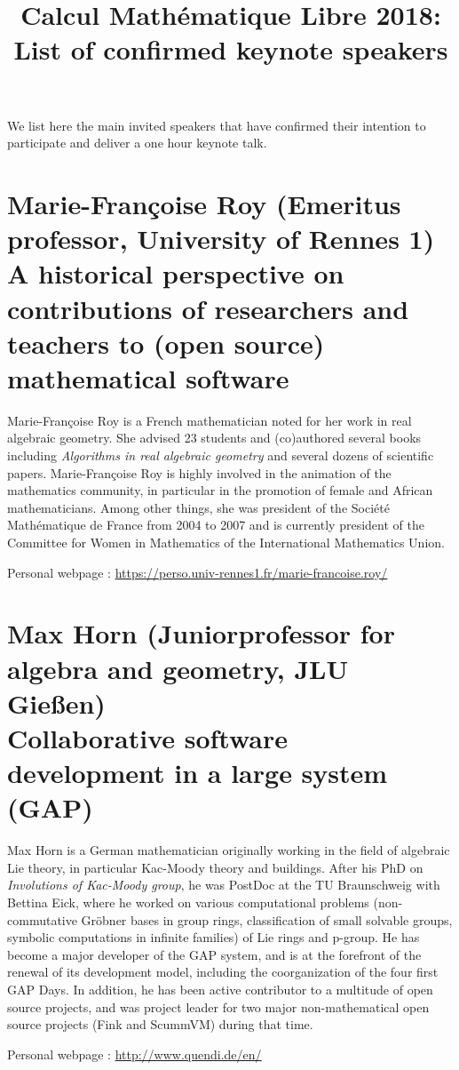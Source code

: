 \documentclass[12pt]{paper}
\title{Calcul Mathématique Libre 2018:\\ List of confirmed keynote speakers}
\date{}
\newcommand{\orateur}[3]{%
  \section*{%
    #1 {\small(#2)}\nopagebreak\\
    #3}
}
\begin{document}
\maketitle
\thispagestyle{empty}

We list here the main invited speakers that have confirmed their
intention to participate and deliver a one hour keynote talk.



\orateur
{Marie-Françoise Roy}
{Emeritus professor, University of Rennes 1}
{A historical perspective on contributions of researchers and teachers
  to (open source) mathematical software}

Marie-Françoise Roy is a French mathematician noted for her work in
real algebraic geometry. She advised 23 students and (co)authored
several books including \textit{Algorithms in real algebraic geometry} and
several dozens of scientific papers. Marie-Françoise Roy is highly
involved in the animation of the mathematics community, in particular
in the promotion of female and African mathematicians. Among other
things, she was president of the Société Mathématique de France from
2004 to 2007 and is currently president of the Committee for Women in
Mathematics of the International Mathematics Union.

Personal webpage : \url{https://perso.univ-rennes1.fr/marie-francoise.roy/}

\orateur
{Max Horn}
{Juniorprofessor for algebra and geometry, JLU Gießen}
{Collaborative software development in a large system (GAP)}
{
  Max Horn is a German mathematician originally working in the field of
  algebraic Lie theory, in particular Kac-Moody theory and buildings. After his
  PhD on \textit{Involutions of Kac-Moody group}, he was PostDoc at the TU
  Braunschweig with Bettina Eick, where he worked on various computational
  problems (non-commutative Gröbner bases in group rings, classification of
  small solvable groups, symbolic computations in infinite families) of Lie
  rings and p-group.
  He has become a major developer of the GAP system, and is at the
  forefront of the renewal of its development model, including the
  coorganization of the four first GAP Days.
  In addition, he has been active contributor to a multitude of open source
  projects, and was project leader for two major non-mathematical open source
  projects (Fink and ScummVM) during that time.

Personal webpage : \url{http://www.quendi.de/en/}
}
\end{document}
